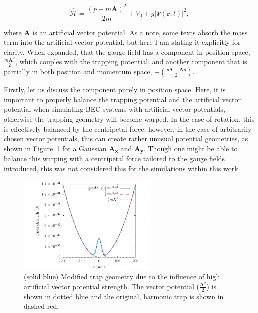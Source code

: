 \begin{equation}
\mathcal{\hat H} = \frac{(p-m\mathbf{A})^2}{2m} + V_0 + g|\Psi(\mathbf{r},t)|^2,
\end{equation}

\noindent where $\mathbf{A}$ is an artificial vector potential.
As a note, some texts absorb the mass term into the artificial vector potential, but here I am  stating it explicitly for clarity.
When expanded, that the gauge field has a component in position space, $\frac{m\mathbf{A}^2}{2}$, which couples with the trapping potential, and another component that is partially in both position and momentum space, $-\left(\frac{p\mathbf{A} + \mathbf{A}p}{2}\right)$.

Firstly, let us discuss the component purely in position space.
Here, it is important to properly balance the trapping potential and the artificial vector potential when simulating BEC systems with artificial vector potentials, otherwise the trapping geometry will become warped.
In the case of rotation, this is effectively balanced by the centripetal force; however, 
in the case of arbitrarily chosen vector potentials, this can create rather unusual potential geometries, as shown in Figure~\ref{fig:V_change} for a Gaussian $\mathbf{A_x}$ and $\mathbf{A_y}$.
Though one might be able to balance this warping with a centripetal force tailored to the gauge fields introduced, this was not considered this for the simulations within this work.

\begin{figure}

\center \includegraphics[width=0.6\textwidth]{data/splitop/gauge/check.pdf}

\caption{
(solid blue) Modified trap geometry due to the influence of high artificial vector potential strength.
The vector potential ($\frac{\mathbf{A}^2}{2}$) is shown in dotted blue and the original, harmonic trap is shown in dashed red.
}
\label{fig:V_change}
\end{figure}

